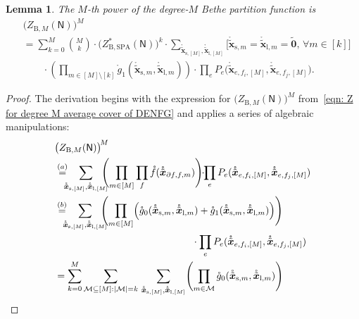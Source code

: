 \documentclass[journal]{IEEEtran}
\newcommand{\add}[1]{{\color{black}#1}}
\newtheorem{lemma}[theorem]{Lemma}
\newcommand{\vect}[1]{ \bm{#1} }
\newcommand{\set}[1]{\mathcal{#1}}
\newcommand{\setpf}{ \partial f }
\newcommand{\graphN}{ \mathsf{N} }
\newcommand{\ZBSPA}{ Z_{\mathrm{B,SPA}} }
\newcommand{\ZBM}{ Z_{\mathrm{B},M} }
\newcommand{\LCTtv}[1]{ \mathring{ \tilde{ \vect{#1} } } }
\newcommand{\LCT}[1]{ \mathring{#1} }
\newcommand{\efi}{ e,f_i }
\newcommand{\efj}{ e,f_j }
\newcommand{\LCTvxlm}{ \LCTtv{x}_{\mathrm{l},m} }
\newcommand{\LCTvxsm}{ \LCTtv{x}_{\mathrm{s},m} }
\newcommand{\LCTvxlM}{ \LCTtv{x}_{\mathrm{l},[M]} }
\newcommand{\LCTvxsM}{ \LCTtv{x}_{\mathrm{s},[M]} }
\newcommand{\gzero}{\LCT{g}_{0}}
\newcommand{\gone}{\LCT{g}_{1}}
\newcommand{\tv}[1]{ \tilde{\vect{#1}} }
\begin{document}
\begin{appendices}
  \begin{lemma}
    \label{lem: expression of go and g1 and pe}
    \add{The $M$-th power of the degree-$M$ Bethe partition function is}
    \begin{align*}
       & \bigl( \ZBM(\graphN) \bigr)^{\! M}
      \\&=
      \sum_{ k = 0 }^{M}
      \binom{M}{k}
      \cdot
      \bigl( \ZBSPA^{*}( \graphN) \bigr)^{\! k}
      \cdot\!\!\!\!\!\! \!\!\! \sum_{ \LCTvxsM, \LCTvxlM }\!\!\! \!\!\!
      \bigl[ \LCTvxsm \! = \! \LCTvxlm \! = \! \tv{0},\, \forall m \in [k] \bigr]
      \\&\qquad\cdot
      \left(
      \prod_{ m \in [M] \setminus [k] }
      \gone( \LCTvxsm, \LCTvxlm )
      \right) \cdot \prod_{e}
      P_{e}\bigl( \LCTtv{x}_{\efi,[M]}, \LCTtv{x}_{\efj,[M]} \bigr).
    \end{align*}
  \end{lemma}
  \begin{proof}
    The derivation begins with the expression for
    $ \bigl( \ZBM(\graphN) \bigr)^{\! M} $ from~\eqref{eqn: Z for degree M
      average cover of DENFG} and applies a series of algebraic manipulations:
    \begin{align}
       &
      \bigl( \ZBM(\graphN) \bigr)^{\! M}
      \nonumber                                                  \\
       & \overset{(a)}{=}
      \!\!\!\!\sum_{ \LCTvxsM, \LCTvxlM }\!\!\!\!
      \Biggl(
      \prod_{m \in [M]} \prod_{f}
      \LCT{f}( \LCTtv{x}_{\setpf,f,m})
      \Biggr)
      \!\!\cdot\!\! \prod_{e}
      P_{e}(\LCTtv{x}_{\efi,[M]}, \LCTtv{x}_{\efj,[M]})
      \nonumber                                                  \\
       & \overset{(b)}{=}
      \!\!\!\!\sum_{ \LCTvxsM, \LCTvxlM }\!\!\!\!
      \Biggl(
      \prod_{m \in [M]}
      \Bigl( \gzero( \LCTvxsm, \LCTvxlm )
      + \gone( \LCTvxsm, \LCTvxlm )
      \Bigr)
      \Biggr)
      \nonumber                                                  \\&\qquad \qquad \qquad\qquad\qquad\qquad\qquad \cdot \prod_{e}
      P_{e}(\LCTtv{x}_{\efi,[M]}, \LCTtv{x}_{\efj,[M]})
      \nonumber                                                  \\
       & =
      \sum_{ k = 0 }^{M} %
      \sum_{ \set{M} \subseteq [M]: |\set{M}| = k}\, %
      \sum_{ \LCTvxsM, \LCTvxlM }
      \Biggl( \prod_{ m \in \set{M} } \gzero( \LCTvxsm, \LCTvxlm ) \Biggr)

\end{align}
\end{proof}
\end{appendices}
\end{document}
